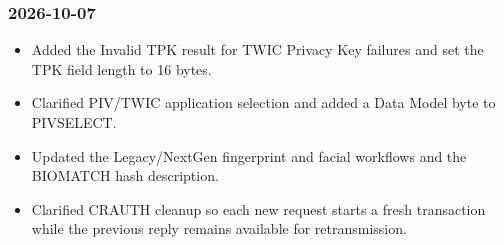 \subsubsection*{2026-10-07}
\begin{itemize}
  \item Added the Invalid TPK result for TWIC Privacy Key failures and set the TPK field length to
    16 bytes.
  \item Clarified PIV/TWIC application selection and added a Data Model byte to PIVSELECT.
  \item Updated the Legacy/NextGen fingerprint and facial workflows and the BIOMATCH hash
    description.
  \item Clarified CRAUTH cleanup so each new request starts a fresh transaction while the previous
    reply remains available for retransmission.
\end{itemize}

